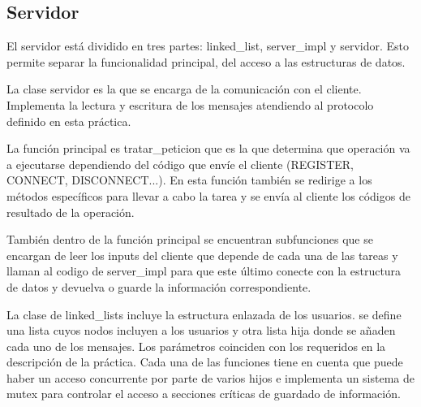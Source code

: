 \subsection{Servidor}

El servidor está dividido en tres partes: linked\_list, server\_impl y servidor. Esto permite separar la funcionalidad principal, del acceso a las estructuras de datos.

La clase servidor es la que se encarga de la comunicación con el cliente. Implementa la lectura y escritura de los mensajes atendiendo al protocolo definido en esta práctica.

La función principal es tratar\_peticion que es la que determina que operación va a ejecutarse dependiendo del código que envíe el cliente (REGISTER, CONNECT, DISCONNECT...). En esta función también se redirige a los métodos específicos para llevar a cabo la tarea y se envía al cliente los códigos de resultado de la operación.

También dentro de la función principal se encuentran subfunciones que se encargan de leer los inputs del cliente que depende de cada una de las tareas y llaman al codigo de server\_impl para que este último conecte con la estructura de datos y devuelva o guarde la información correspondiente.

La clase de linked\_lists incluye la estructura enlazada de los usuarios. se define una lista cuyos nodos incluyen a los usuarios y otra lista hija donde se añaden cada uno de los mensajes. Los parámetros coinciden con los requeridos en la descripción de la práctica. Cada una de las funciones tiene en cuenta que puede haber un acceso concurrente por parte de varios hijos e implementa un sistema de mutex para controlar el acceso a secciones críticas de guardado de información.